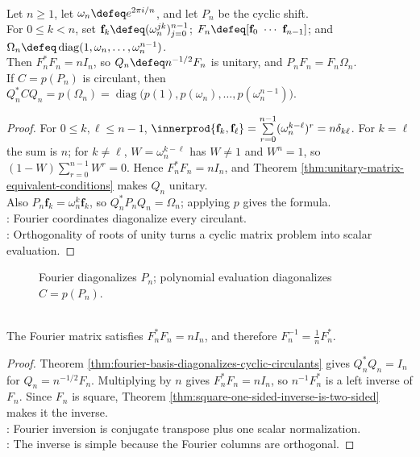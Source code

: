\begin{theorem} \label{thm:fourier-basis-diagonalizes-cyclic-circulants} \\
Let $n\geq1$, let $\omega_n\defeq e^{2\pi i/n}$, and let $P_n$ be the cyclic shift.\\
For $0\leq k<n$, set $\mathbf{f}_k\defeq(\omega_n^{jk})_{j=0}^{n-1}$; $F_n\defeq[\mathbf{f}_0\ \cdots\ \mathbf{f}_{n-1}]$; and $\Omega_n\defeq\operatorname{diag}(1,\omega_n,\ldots,\omega_n^{n-1})$.\\
Then $F_n^*F_n=nI_n$, so $Q_n\defeq n^{-1/2}F_n$ is unitary, and $P_nF_n=F_n\Omega_n$.\\
If $C=p(P_n)$ is circulant, then $Q_n^*CQ_n=p(\Omega_n) =\operatorname{diag}\bigl(p(1),p(\omega_n),\ldots,p(\omega_n^{n-1})\bigr)$.
\begin{proof}
For $0\leq k,\ell\leq n-1$, $\innerprod{\mathbf{f}_k,\mathbf{f}_\ell} =\sum\limits_{r=0}^{n-1}(\omega_n^{k-\ell})^r =n\delta_{k\ell}$.
For $k=\ell$ the sum is $n$; for $k\neq\ell$, $W=\omega_n^{k-\ell}$ has $W\neq1$ and $W^n=1$, so $(1-W)\sum\limits_{r=0}^{n-1}W^r=0$. Hence $F_n^*F_n=nI_n$, and Theorem \ref{thm:unitary-matrix-equivalent-conditions} makes $Q_n$ unitary.\\
Also $P_n\mathbf{f}_k=\omega_n^k\mathbf{f}_k$, so $Q_n^*P_nQ_n=\Omega_n$; applying $p$ gives the formula.\\
: Fourier coordinates diagonalize every circulant.\\
: Orthogonality of roots of unity turns a cyclic matrix problem into scalar evaluation.
\end{proof}
\end{theorem}

\begin{figure}[H]
  \centering
  
  \caption{Fourier diagonalizes $P_n$; polynomial evaluation diagonalizes $C=p(P_n)$.}
  \label{fig:circulant-fourier-diagonalization}
\end{figure}

\begin{proposition} \label{prop:fourier-matrix-inverse} \\
The Fourier matrix satisfies $F_n^*F_n=nI_n$, and therefore $F_n^{-1}=\frac1nF_n^*$.
\begin{proof}
Theorem \ref{thm:fourier-basis-diagonalizes-cyclic-circulants} gives $Q_n^*Q_n=I_n$ for $Q_n=n^{-1/2}F_n$. Multiplying by $n$ gives $F_n^*F_n=nI_n$, so $n^{-1}F_n^*$ is a left inverse of $F_n$. Since $F_n$ is square, Theorem \ref{thm:square-one-sided-inverse-is-two-sided} makes it the inverse.\\
: Fourier inversion is conjugate transpose plus one scalar normalization.\\
: The inverse is simple because the Fourier columns are orthogonal.
\end{proof}
\end{proposition}

